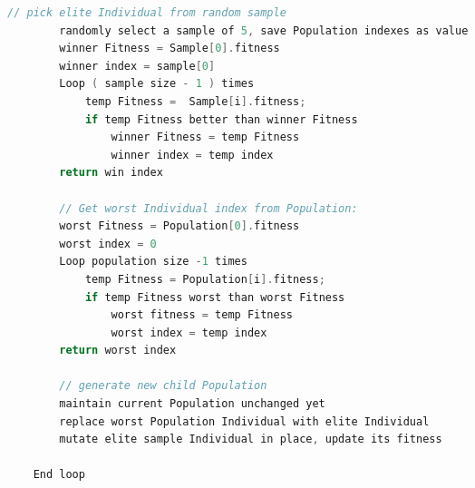 \documentclass{article}
\begin{document}
\begin{CJK}{UTF8}{gbsn}
\begin{lstlisting}[language=c++]
        // pick elite Individual from random sample
        randomly select a sample of 5, save Population indexes as value
        winner Fitness = Sample[0].fitness
        winner index = sample[0]
        Loop ( sample size - 1 ) times
            temp Fitness =  Sample[i].fitness;
            if temp Fitness better than winner Fitness
                winner Fitness = temp Fitness
                winner index = temp index
        return win index

        // Get worst Individual index from Population:  
        worst Fitness = Population[0].fitness
        worst index = 0
        Loop population size -1 times
            temp Fitness = Population[i].fitness;
            if temp Fitness worst than worst Fitness
                worst fitness = temp Fitness
                worst index = temp index
        return worst index

        // generate new child Population
        maintain current Population unchanged yet
        replace worst Population Individual with elite Individual
        mutate elite sample Individual in place, update its fitness 

    End loop
\end{lstlisting}



\end{CJK}
\end{document}
